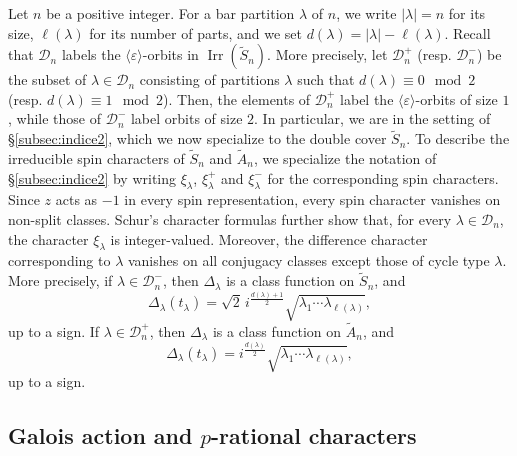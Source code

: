 \documentclass[reqno]{amsart}
\DeclareMathOperator{\Irr}{Irr}
\newcommand{\tSym}{\widetilde{S}}
\newcommand{\tAlt}{\widetilde{A}}
\theoremstyle{definition}
\begin{document}
Let $n$ be a positive integer. For a bar partition $\lambda$ of $n$,
we write $|\lambda|=n$ for its size, $\ell(\lambda)$ for its number of
parts, and we set $ d(\lambda)=|\lambda|-\ell(\lambda)$.
Recall that $\mathcal D_n$ labels the $\langle \varepsilon\rangle$-orbits in
$\Irr(\tSym_n)$. 
    More precisely, let $\mathcal D_n^+$ (resp. $\mathcal D_n^-$) be the
subset of $\lambda\in\mathcal D_n$ consisting of partitions $\lambda$ such
that $d(\lambda)\equiv 0\mod 2$ (resp.\! $d(\lambda)\equiv 1\mod 2$).
Then, the elements of $\mathcal D_n^+$ label the
$\langle\varepsilon\rangle$-orbits of size $1$, while those of $\mathcal
D_n^-$ label orbits of size $2$. In particular, we are in the setting of
\S\ref{subsec:indice2}, which we now specialize to the double cover
$\tSym_n$.
To describe the irreducible spin characters of $\tSym_n$ and
$\tAlt_n$, we specialize the notation of \S\ref{subsec:indice2} by
writing $\xi_\lambda$, $\xi_\lambda^+$ and $\xi_\lambda^-$ for the
corresponding spin characters.
Since $z$ acts as $-1$ in every spin representation, every spin
character vanishes on non-split classes. Schur's character formulas
\cite[\S4.2, (18) and (19)]{BrNaMZ}
further show that, for every $\lambda\in\mathcal D_n$, the character
$\xi_\lambda$ is integer-valued.
Moreover, the difference character corresponding to $\lambda$ vanishes
on all conjugacy classes except those of cycle type $\lambda$.
More precisely, 
if $\lambda\in\mathcal D_n^-$, then $\Delta_\lambda$ is a class
function on $\tSym_n$, and
\begin{equation}
\label{eq:diffSntilte}
\Delta_\lambda(t_\lambda)=
\sqrt 2\,i^{\frac{d(\lambda)+1}{2}}
\sqrt{\lambda_1\cdots\lambda_{\ell(\lambda)}},
\end{equation}
up to a sign.
If $\lambda\in\mathcal D_n^+$, then $\Delta_\lambda$ is a class
function on $\tAlt_n$, and
\begin{equation}
\label{eq:diffAntilte}
\Delta_\lambda(t_\lambda)=
i^{\frac{d(\lambda)}{2}}
\sqrt{\lambda_1\cdots\lambda_{\ell(\lambda)}},
\end{equation}
up to a sign.

\subsection{Galois action and $p$-rational characters}
\end{document}
